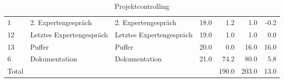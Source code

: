 \begin{table}[H]
{\begin{tabular}{llllrrr}
1 & 2. Expertengespräch & 2. Expertengespräch & 18.0 & 1.2 & 1.0 & -0.2 \\
12 & Letztes Expertengespräch & Letztes Expertengespräch & 19.0 & 1.0 & 1.0 & 0.0 \\
13 & Puffer & Puffer & 20.0 & 0.0 & 16.0 & 16.0 \\
6 & Dokumentation & Dokumentation & 21.0 & 74.2 & 80.0 & 5.8 \\
Total &  &  &  & 190.0 & 203.0 & 13.0 \\
\bottomrule
\end{tabular}
}
\caption{Projektcontrolling} \label{projektcontrolling}
\end{table}
